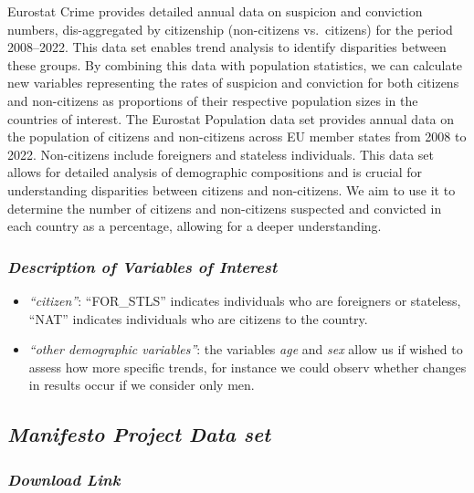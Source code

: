 \documentclass[
]{article}
\providecommand{\tightlist}{%
  \setlength{\itemsep}{0pt}\setlength{\parskip}{0pt}}\usepackage{longtable,booktabs,array}
\begin{document}
Eurostat Crime provides detailed annual data on suspicion and conviction
numbers, dis-aggregated by citizenship (non-citizens vs.~citizens) for
the period 2008--2022. This data set enables trend analysis to identify
disparities between these groups. By combining this data with population
statistics, we can calculate new variables representing the rates of
suspicion and conviction for both citizens and non-citizens as
proportions of their respective population sizes in the countries of
interest. The Eurostat Population data set provides annual data on the
population of citizens and non-citizens across EU member states from
2008 to 2022. Non-citizens include foreigners and stateless individuals.
This data set allows for detailed analysis of demographic compositions
and is crucial for understanding disparities between citizens and
non-citizens. We aim to use it to determine the number of citizens and
non-citizens suspected and convicted in each country as a percentage,
allowing for a deeper understanding.

\subsubsection{\texorpdfstring{\emph{Description of Variables of
Interest}}{Description of Variables of Interest}}\label{description-of-variables-of-interest-1}

\begin{itemize}
\tightlist
\item
  \emph{``citizen''}: ``FOR\_STLS'' indicates individuals who are
  foreigners or stateless, ``NAT'' indicates individuals who are
  citizens to the country.
\item
  \emph{``other demographic variables''}: the variables \emph{age} and
  \emph{sex} allow us if wished to assess how more specific trends, for
  instance we could observ whether changes in results occur if we
  consider only men.
\end{itemize}

\subsection{\texorpdfstring{\emph{Manifesto Project Data
set}}{Manifesto Project Data set}}\label{manifesto-project-data-set}

\subsubsection{\texorpdfstring{\emph{Download
Link}}{Download Link}}\label{download-link-2}
\end{document}
